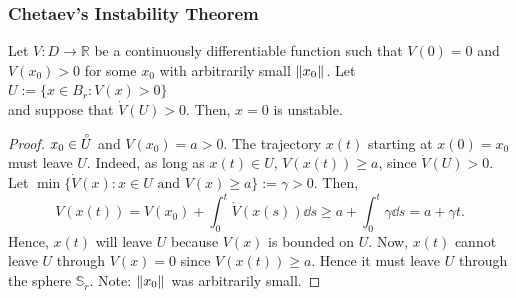 \begin{frame}
    \frametitle{Chetaev's Instability Theorem}

    \begin{theorem}
        Let $V: D \rightarrow \mathbb{R}$ be a continuously differentiable
        function such that $V(0) = 0$ and $V(x_0) > 0$ for some $x_0$ with
        arbitrarily small $\|{x_0}\|_{{}_{}}$. Let\\[0.5ex] \hspace{35mm} $U := \{ x
        \in B_r: V(x) > 0\}$\\[0.5ex] and suppose that $\dot{V}(U) > 0$. Then,
        $x=0$ is unstable.
    \end{theorem}

    \begin{proof}
        $x_0 \in \accentset{\circ}{U}$ and $V(x_0) = a > 0$. The trajectory
        $x(t)$ starting at $x(0) = x_0$ must leave $U$. Indeed, as long as $x(t)
        \in U$, $V(x(t)) \geq a$, since $\dot{V}(U) > 0$. Let $\min 
        \{\dot{V}(x): x \in U \text{ and } V(x) \geq a \} := \gamma > 0$.  Then, 
        \[ V(x(t)) = V(x_0) + \int_0^t \dot{V}(x(s)) \dd s \geq a + \int_0^t
        \gamma \dd s = a + \gamma t. \] Hence, $x(t)$ will leave $U$ because
        $V(x)$ is bounded on $U$. Now, $x(t)$ cannot leave $U$ through $V(x) =
        0$ since $V(x(t)) \geq a$. Hence it must leave $U$ through the sphere
        $\mathbb{S}_r$. Note: $\|{x_0}\|_{{}_{}}$ was arbitrarily small.
    \end{proof}
\end{frame}

\endgroup